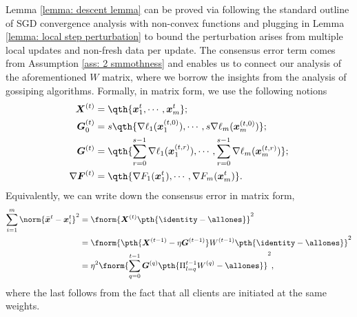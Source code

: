 \documentclass[letterpaper, 10 pt, conference]{ieeeconf}  %
\newcommand{\x}{{\bm x}}
\begin{document}
\begin{remark}
Lemma \ref{lemma: descent lemma} can be proved via following the standard outline of SGD convergence analysis with non-convex functions and plugging in Lemma \ref{lemma: local step perturbation} to bound the perturbation arises from multiple local updates and non-fresh data per update. 
The consensus error term comes from Assumption \ref{ass: 2 smmothness} and enables us to connect 
our analysis of the aforementioned $W$ matrix, where we borrow the insights from the analysis of gossiping algorithms.
Formally, in matrix form, we use the following notions
\begin{align*}
\bm{X}^{(t)} & = \qth{\x_1^t, \cdots, \x_m^t};   \\
\bm{G}_0^{(t)} &= s\qth{\nabla \ell_1(\x_1^{(t,0)}), \cdots,  s\nabla \ell_m(\x_m^{(t,0)})};\\
\bm{G}^{(t)} & = \qth{\sum_{r=0}^{s-1}\nabla \ell_1(\x_1^{(t,r)}), \cdots,  \sum_{r=0}^{s-1}\nabla \ell_m(\x_m^{(t,r)})} ;\\
\nabla \bm{F}^{(t)} & = \qth{\nabla F_1(\x_1^t), \cdots,  \nabla F_m(\x_m^t)}. 
\end{align*}
Equivalently, we can write down the consensus error in matrix form,
\begin{align*}
\sum_{i=1}^m \norm{\bar{\x}^{t} - \x_i^t}^2 
&= \fnorm{\bm{X}^{(t)} \pth{\identity - \allones}}^2\\
&= \fnorm{\pth{\bm{X}^{(t-1)} - \eta \bm{G}^{(t-1)}} W^{(t-1)} \pth{\identity - \allones}}^2 \\
&= \eta^2 \fnorm{\sum_{q=0}^{t-1} \bm{G}^{(q)} \pth{\Pi_{l=q}^{t-1} W^{(q)} - \allones}}^2,
\end{align*}
where the last follows from the fact that all clients are initiated at the same weights.
\end{remark}
\end{document}
